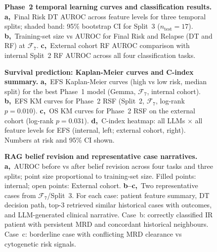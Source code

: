 \documentclass[pdflatex,sn-nature]{sn-jnl}
\begin{document}
\begin{figure}[ht]
\caption{\textbf{Phase~2 temporal learning curves and classification
results.}
\textbf{a,}~Final Risk DT AUROC across feature levels for three
temporal splits; shaded band: 95\% bootstrap CI for Split~3
($n_\text{test}=17$).
\textbf{b,}~Training-set size vs AUROC for Final Risk and Relapse
(DT and RF) at $\mathcal{F}_7$.
\textbf{c,}~External cohort RF AUROC comparison with internal
Split~2 RF AUROC across all four classification tasks.}
\label{fig:p2ablation}
\end{figure}

\begin{figure}[ht]
\caption{\textbf{Survival prediction: Kaplan-Meier curves and
C-index summary.}
\textbf{a,}~EFS Kaplan-Meier curves (high vs low risk, median split)
for the best Phase~1 model (Gemma, $\mathcal{F}_7$, internal cohort).
\textbf{b,}~EFS KM curves for Phase~2 RSF (Split~2, $\mathcal{F}_7$,
log-rank $p=0.010$).
\textbf{c,}~OS KM curves for Phase~2 RSF on the external cohort
(log-rank $p=0.031$).
\textbf{d,}~C-index heatmap: all LLMs $\times$ all feature levels
for EFS (internal, left; external cohort, right).
Numbers at risk and 95\% CI shown.}
\label{fig:km}
\end{figure}

\begin{figure}[ht]
\caption{\textbf{RAG belief revision and representative case narratives.}
\textbf{a,}~AUROC before vs after belief revision across four tasks
and three splits; point size proportional to training-set size.
Filled points: internal; open points: External cohort.
\textbf{b--c,}~Two representative cases from $\mathcal{F}_7$/Split~3.
For each case: patient feature summary, DT decision path, top-3
retrieved similar historical cases with outcomes, and LLM-generated
clinical narrative.
Case~b: correctly classified IR patient with persistent MRD and
concordant historical neighbours.
Case~c: borderline case with conflicting MRD clearance vs cytogenetic
risk signals.}
\label{fig:rag}
\end{figure}
\end{document}
